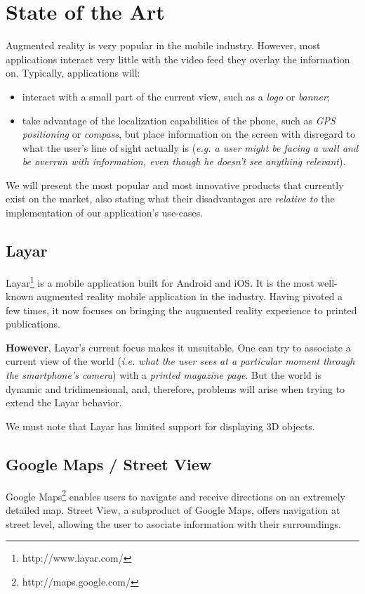 \documentclass[a4paper,onecolumn,oneside,titlepage,11pt]{report}
\begin{document}
\chapter{State of the Art}
\label{chap:state-of-the-art}
Augmented reality is very popular in the mobile industry. However, most applications interact very little with the video feed they overlay the information on. Typically, applications will:
\begin{itemize}
	\item interact with a small part of the current view, such as a \emph{logo} or \emph{banner};
	\item take advantage of the localization capabilities of the phone, such as \emph{GPS positioning} or \emph{compass}, but place information on the screen with disregard to what the user's line of sight actually is (\emph{e.g. a user might be facing a wall and be overrun with information, even though he doesn't see anything relevant}).
\end{itemize}
We will present the most popular and most innovative products that currently exist on the market, also stating what their disadvantages are \emph{relative to} the implementation of our application's use-cases.
\section{Layar}
Layar\footnote{http://www.layar.com/} is a mobile application built for Android and iOS. It is the most well-known augmented reality mobile application in the industry. Having pivoted a few times, it now focuses on bringing the augmented reality experience to printed publications.

\textbf{However}, Layar's current focus makes it unsuitable. One can try to associate a current view of the world (\emph{i.e. what the user sees at a particular moment through the smartphone's camera}) with a \emph{printed magazine page}. But the world is dynamic and tridimensional, and, therefore, problems will arise when trying to extend the Layar behavior.

We must note that Layar has limited support for displaying 3D objects.
\section{Google Maps / Street View}
Google Maps\footnote{http://maps.google.com/} enables users to navigate and receive directions on an extremely detailed map. Street View, a subproduct of Google Maps, offers navigation at street level, allowing the user to asociate information with their surroundings.
\end{document}

